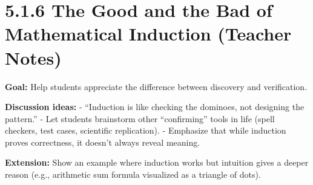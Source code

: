 \section*{5.1.6 The Good and the Bad of Mathematical Induction (Teacher Notes)}

\textbf{Goal:} Help students appreciate the difference between discovery and verification.  

\textbf{Discussion ideas:}
- “Induction is like checking the dominoes, not designing the pattern.”
- Let students brainstorm other “confirming” tools in life (spell checkers, test cases, scientific replication).
- Emphasize that while induction proves correctness, it doesn’t always reveal meaning.

\textbf{Extension:}  
Show an example where induction works but intuition gives a deeper reason (e.g., arithmetic sum formula visualized as a triangle of dots).  

